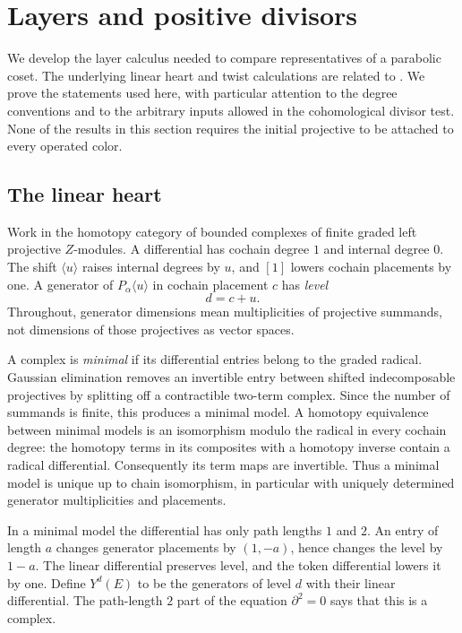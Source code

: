 \section{Layers and positive divisors}
\label{sec:layers}

We develop the layer calculus needed to compare representatives of a
parabolic coset.  The underlying linear heart and twist calculations
are related to \cite[Sections~5 and~6.1]{HengLicata2024}.
We prove the statements used here, with particular attention to the degree conventions
and to the arbitrary inputs allowed in the cohomological divisor test.
None of the results in this section requires the initial projective to
be attached to every operated color.

\subsection{The linear heart}

Work in the homotopy category of bounded complexes of finite graded left
projective $Z$-modules.  A differential has cochain degree $1$ and
internal degree $0$.  The shift $\langle u\rangle$ raises internal
degrees by $u$, and $[1]$ lowers cochain placements by one.  A generator
of $P_\alpha\langle u\rangle$ in cochain placement $c$ has
\emph{level}
\begin{equation}
 d=c+u.\label{lay:level}
\end{equation}
Throughout, generator dimensions mean multiplicities of projective
summands, not dimensions of those projectives as vector spaces.

A complex is \emph{minimal} if its differential entries belong to the
graded radical.  Gaussian elimination removes an invertible entry
between shifted indecomposable projectives by splitting off a
contractible two-term complex.  Since the number of summands is finite,
this produces a minimal model.  A homotopy equivalence between minimal
models is an isomorphism modulo the radical in every cochain degree:
the homotopy terms in its composites with a homotopy inverse contain a
radical differential.  Consequently its term maps are invertible.
Thus a minimal model is unique up to chain isomorphism, in particular
with uniquely determined generator multiplicities and placements.

In a minimal model the differential has only path lengths $1$ and $2$.
An entry of length $a$ changes generator placements by $(1,-a)$, hence
changes the level by $1-a$.  The linear differential preserves level,
and the token differential lowers it by one.  Define $Y^d(E)$ to be the
generators of level $d$ with their linear differential.  The path-length
$2$ part of the equation $\partial^2=0$ says that this is a complex.

